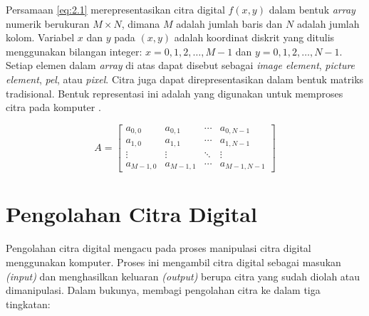     Persamaan \ref{eq:2.1} merepresentasikan citra digital $f(x, y)$ dalam bentuk \textit{array} numerik berukuran $M \times N$, dimana $M$ adalah jumlah baris dan $N$ adalah jumlah kolom. Variabel $x$ dan $y$ pada $(x, y)$ adalah koordinat diskrit yang ditulis menggunakan bilangan integer: $x = 0, 1, 2, \ldots, M - 1$ dan $y = 0, 1, 2, \ldots, N - 1$. Setiap elemen dalam \textit{array} di atas dapat disebut sebagai \textit{image element}, \textit{picture element}, \textit{pel}, atau \textit{pixel}. Citra juga dapat direpresentasikan dalam bentuk matriks tradisional. Bentuk representasi ini adalah yang digunakan untuk memproses citra pada komputer \citep{Gonzalez2018}.
    
    \begin{equation}\label{eq:2.1}
        A = 
        \begin{bmatrix}
        a_{0, 0} & a_{0, 1} & \cdots & a_{0, N - 1}\\
        a_{1, 0} & a_{1, 1} & \cdots & a_{1, N - 1}\\
        \vdots & \vdots & \ddots & \vdots \\
        a_{M - 1, 0} & a_{M - 1, 1} & \cdots & a_{M - 1, N - 1}
        \end{bmatrix}
    \end{equation}
  
\section{Pengolahan Citra Digital}
    Pengolahan citra digital mengacu pada proses manipulasi citra digital menggunakan komputer. Proses ini mengambil citra digital sebagai masukan \textit{(input)} dan menghasilkan keluaran \textit{(output)} berupa citra yang sudah diolah atau dimanipulasi. Dalam bukunya, \citet{Gonzalez2018} membagi pengolahan citra ke dalam tiga tingkatan:
    

